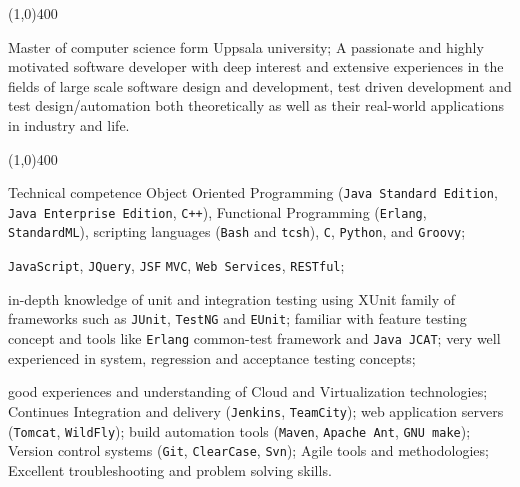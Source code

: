 \documentclass{resume}
\author{Amin Khorsandi}
\begin{document}
\maketitle

\begin{center}
\line(1,0){400}
\end{center}

\par \begin{flushleft}Master of computer science form Uppsala university; 
A passionate and highly motivated software developer with deep interest 
and extensive experiences in the fields of large scale software 
design and development, test driven development and test design/automation
both theoretically as well as their real-world applications in industry and life.
\end{flushleft}

\begin{center}
\line(1,0){400}
\end{center}

\begin{category}{Technical competence}
\hspace{1 mm}Object Oriented Programming 
(\texttt{Java Standard Edition}, \texttt{Java Enterprise Edition}, \texttt{C++}), 
Functional Programming (\texttt{Erlang}, \texttt{StandardML}), 
scripting languages (\texttt{Bash} and \texttt{tcsh}), \texttt{C}, \texttt{Python}, 
and \texttt{Groovy};

\hspace{1 mm}\texttt{JavaScript}, \texttt{JQuery}, \texttt{JSF} 
\texttt{MVC}, \texttt{Web Services}, \texttt{RESTful};


\hspace{1 mm}in-depth knowledge of unit and integration 
testing using XUnit family of frameworks such as \texttt{JUnit}, \texttt{TestNG} and \texttt{EUnit}; 
familiar with feature testing concept and tools like \texttt{Erlang} common-test 
framework and \texttt{Java JCAT}; very well experienced in system, regression and acceptance testing concepts;

\hspace{1 mm}good experiences and understanding of Cloud and Virtualization technologies;
Continues Integration and delivery (\texttt{Jenkins}, \texttt{TeamCity});
web application servers (\texttt{Tomcat}, \texttt{WildFly}); 
build automation tools (\texttt{Maven}, \texttt{Apache Ant}, \texttt{GNU make}); 
Version control systems (\texttt{Git}, \texttt{ClearCase}, \texttt{Svn});
Agile tools and methodologies; Excellent troubleshooting and problem solving skills.

\end{category}
\end{document}
